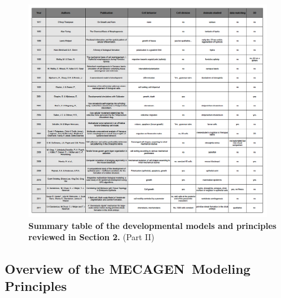 \begin{figure}
\begin{center}
\includegraphics[width=0.95\textwidth]{../../images/Development_Review/theoretical_model/review3_part2.png}
\end{center}
\caption{\textbf{Summary table of the developmental models and principles reviewed in Section 2.} (Part II)}
\label{theoretical_model_review2}
\end{figure}

\subsection{Overview of the MECAGEN Modeling Principles }

